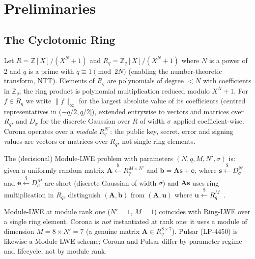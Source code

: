 \section{Preliminaries}

\label{sec:prelim}

\subsection{The Cyclotomic Ring}

Let $R = \mathbb{Z}[X]/(X^N + 1)$ and $R_q = \mathbb{Z}_q[X]/(X^N + 1)$ where $N$ is
a power of 2 and $q$ is a prime with $q \equiv 1 \pmod{2N}$ (enabling the number-theoretic
transform, NTT). Elements of $R_q$ are polynomials of degree $< N$ with coefficients in
$\mathbb{Z}_q$; the ring product is polynomial multiplication reduced modulo $X^N + 1$.
For $f \in R_q$ we write $\|f\|_\infty$ for the largest absolute value of its coefficients
(centred representatives in $(-q/2, q/2]$), extended entrywise to vectors and matrices over
$R_q$, and $D_\sigma$ for the discrete Gaussian over $R$ of width $\sigma$ applied
coefficient-wise. Corona operates over a \emph{module} $R_q^{N'}$: the public key, secret,
error and signing values are vectors or matrices over $R_q$, not single ring elements.

\begin{definition}
\label{def:mlwe}
The (decisional) Module-LWE problem with parameters $(N, q, M, N', \sigma)$ is: given a
uniformly random matrix $\mathbf{A} \stackrel{\$}{\leftarrow} R_q^{M \times N'}$ and
$\mathbf{b} = \mathbf{A}\mathbf{s} + \mathbf{e}$, where
$\mathbf{s} \stackrel{\$}{\leftarrow} D_\sigma^{N'}$ and
$\mathbf{e} \stackrel{\$}{\leftarrow} D_\sigma^{M}$ are short (discrete Gaussian of width
$\sigma$) and $\mathbf{A}\mathbf{s}$ uses ring multiplication in $R_q$, distinguish
$(\mathbf{A}, \mathbf{b})$ from $(\mathbf{A}, \mathbf{u})$ where
$\mathbf{u} \stackrel{\$}{\leftarrow} R_q^{M}$~\cite{langlois2015module}.
\end{definition}

\begin{remark}
\label{rem:rank}
Module-LWE at module rank one ($N' = 1$, $M = 1$) coincides with Ring-LWE over a single
ring element. Corona is \emph{not} instantiated at rank one: it uses a module of dimension
$M = 8 \times N' = 7$ (a genuine matrix $\mathbf{A} \in R_q^{8 \times 7}$). Pulsar
(LP-4450) is likewise a Module-LWE scheme; Corona and Pulsar differ by parameter regime
and lifecycle, not by module rank.
\end{remark}

